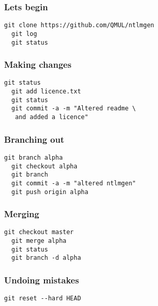 \documentclass{beamer}
\begin{document}
\begin{frame}[fragile]
  \frametitle{Lets begin}

  \begin{lstlisting}[caption=Basic Commands] 
  git clone https://github.com/QMUL/ntlmgen
  git log
  git status
  \end{lstlisting}

\end{frame}


\begin{frame}[fragile]
  \frametitle{Making changes}
  
  \begin{lstlisting}[caption=Making changes] 
  git status
  git add licence.txt
  git status
  git commit -a -m "Altered readme \
   and added a licence"
  \end{lstlisting}

\end{frame}


\begin{frame}[fragile]
  \frametitle{Branching out}
  
  \begin{lstlisting}[caption=Branching] 
  git branch alpha
  git checkout alpha
  git branch
  git commit -a -m "altered ntlmgen"
  git push origin alpha
  \end{lstlisting}

\end{frame}


\begin{frame}[fragile]
  \frametitle{Merging}
  
  \begin{lstlisting}[caption=Merging] 
  git checkout master
  git merge alpha
  git status
  git branch -d alpha
  \end{lstlisting}

\end{frame}



\begin{frame}[fragile]
  \frametitle{Undoing mistakes}
  
  \begin{lstlisting}[caption=Hard Reset] 
  git reset --hard HEAD
  \end{lstlisting}

\end{frame}









\end{document}
